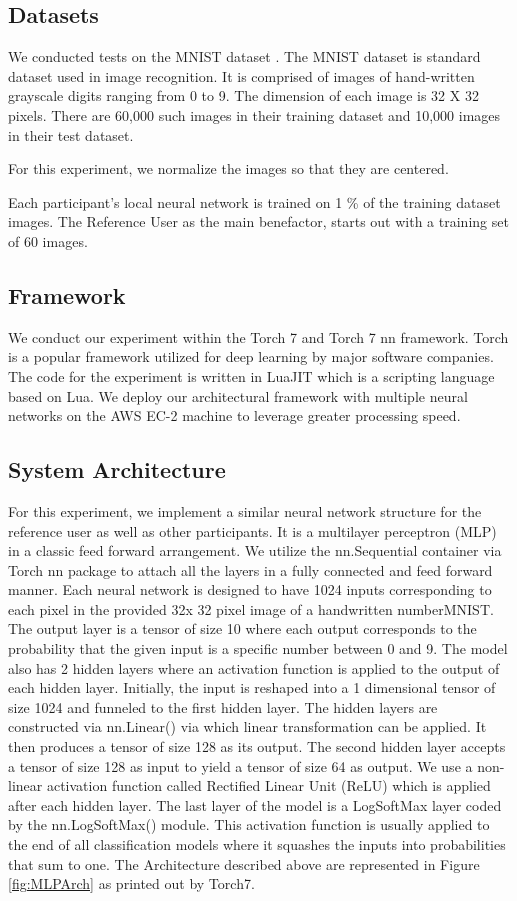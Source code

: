 \documentclass[conference]{IEEEtran}
\begin{document}
\subsection{Datasets}
We conducted tests on the MNIST dataset \cite{MNIST}. The MNIST dataset is standard dataset used in image recognition. It is comprised of images of hand-written grayscale digits ranging from 0 to 9. The dimension of each image is 32 X 32 pixels. There are 60,000 such images in their training dataset and 10,000 images in their test dataset.

For this experiment, we normalize the images so that they are centered.

Each participant's local neural network is trained on 1 \% of the training dataset images. 
The Reference User as the main benefactor, starts out with a training set of 60 images.

\subsection{Framework}
We conduct our experiment within the Torch 7 and Torch 7 nn framework. Torch is a popular framework utilized for deep learning by major software companies. The code for the experiment is written in LuaJIT which is a scripting language based on Lua. 
We deploy our architectural framework with multiple neural networks on the AWS EC-2 machine to leverage greater processing speed.

\subsection{System Architecture}
For this experiment, we implement a similar neural network structure for the reference user as well as other participants. It is a multilayer perceptron (MLP) in a classic feed forward arrangement. We utilize the nn.Sequential container via Torch nn package to attach all the layers in a fully connected and feed forward manner.
Each neural network is designed to have 1024 inputs corresponding to each pixel in the provided 32x 32 pixel image of a handwritten number{MNIST}. The output layer is a tensor of size 10 where each output corresponds to the probability that the given input is a specific number between 0 and 9. The model also has 2 hidden layers where an activation function is applied to the output of each hidden layer.
Initially, the input is reshaped into a 1 dimensional tensor of size 1024 and funneled to the first hidden layer. The hidden layers are constructed via nn.Linear() via which linear transformation can be applied. It then produces a tensor of size 128 as its output. The second hidden layer accepts a tensor of size 128 as input to yield a tensor of size 64 as output. We use a non-linear activation function called Rectified Linear Unit (ReLU) which is applied after each hidden layer. The last layer of the model is a LogSoftMax layer coded by the nn.LogSoftMax() module.  This activation function is usually applied to the end of all classification models where it squashes the inputs into probabilities that sum to one.
The Architecture described above are represented in Figure \ref{fig:MLPArch} as printed out by Torch7.
\end{document}
